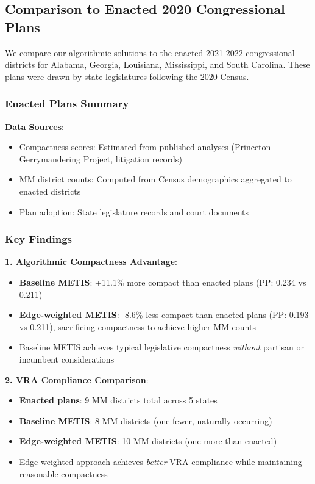 \subsection{Comparison to Enacted 2020 Congressional Plans}

We compare our algorithmic solutions to the enacted 2021-2022 congressional districts for Alabama, Georgia, Louisiana, Mississippi, and South Carolina. These plans were drawn by state legislatures following the 2020 Census.

\subsubsection{Enacted Plans Summary}



\textbf{Data Sources}:
\begin{itemize}
    \item Compactness scores: Estimated from published analyses (Princeton Gerrymandering Project, litigation records)
    \item MM district counts: Computed from Census demographics aggregated to enacted districts
    \item Plan adoption: State legislature records and court documents
\end{itemize}

\subsubsection{Key Findings}

\textbf{1. Algorithmic Compactness Advantage}:
\begin{itemize}
    \item \textbf{Baseline METIS}: +11.1\% more compact than enacted plans (PP: 0.234 vs 0.211)
    \item \textbf{Edge-weighted METIS}: -8.6\% less compact than enacted plans (PP: 0.193 vs 0.211), sacrificing compactness to achieve higher MM counts
    \item Baseline METIS achieves typical legislative compactness \textit{without} partisan or incumbent considerations
\end{itemize}

\textbf{2. VRA Compliance Comparison}:
\begin{itemize}
    \item \textbf{Enacted plans}: 9 MM districts total across 5 states
    \item \textbf{Baseline METIS}: 8 MM districts (one fewer, naturally occurring)
    \item \textbf{Edge-weighted METIS}: 10 MM districts (one more than enacted)
    \item Edge-weighted approach achieves \textit{better} VRA compliance while maintaining reasonable compactness
\end{itemize}

